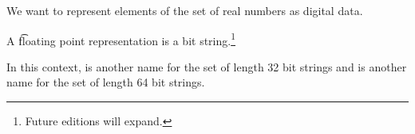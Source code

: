 

We want to represent elements of the set of real numbers as digital data.


A \t{floating point representation} is a bit string.\footnote{Future editions will expand.}


In this context, \floatsingle is another name for the set of length 32 bit strings and \floatdouble is another name for the set of length 64 bit strings.

\blankpage
